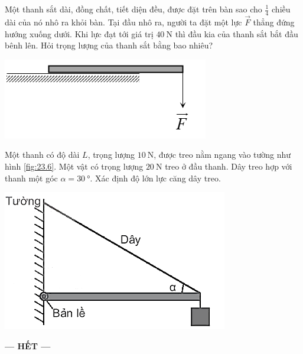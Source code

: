\begin{ex}
	Một thanh sắt dài, đồng chất, tiết diện đều, được đặt trên bàn sao cho $\frac{1}{4}$ chiều dài của nó nhô ra khỏi bàn. Tại đầu nhô ra, người ta đặt một lực $\vec F$ thẳng đứng hướng xuống dưới. Khi lực đạt tới giá trị $\SI{40}{\newton}$ thì đầu kia của thanh sắt bắt đầu bênh lên. Hỏi trọng lượng của thanh sắt bằng bao nhiêu?
	\begin{center}
		\includegraphics[width=0.4\linewidth]{../figs/VN10-2022-PH-TP023-P-10}
	\end{center}
\end{ex}

\begin{ex}
	Một thanh có độ dài $L$, trọng lượng $\SI{10}{\newton}$, được treo nằm ngang vào tường như hình \ref{fig:23.6}. Một vật có trọng lượng $\SI{20}{\newton}$ treo ở đầu thanh. Dây treo hợp với thanh một góc $\alpha=\SI{30}{\degree}$. Xác định độ lớn lực căng dây treo.
	\begin{center}
		\includegraphics[width=0.4\linewidth]{../figs/VN10-2022-PH-TP023-P-6}
		\label{fig:23.6}
	\end{center}	
\end{ex}
\begin{center}
	\textbf{--- HẾT ---}
\end{center}